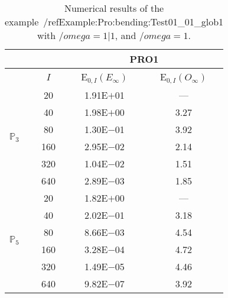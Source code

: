 \begin{table}[H]
\caption{Numerical results of the example~/ref{Example:Pro:bending:Test01_01_glob1} with $/omega=1|1$, and $/omega=1$.}
\setlength{\tabcolsep}{5pt}
\centering
\begin{tabular}{@{}l c c c@{}}
\toprule
 &  & \multicolumn{2}{c}{PRO1}\\
\midrule
 & $I$ & E$_{0,I}(E_{\infty})$ & E$_{0,I}(O_{\infty})$\\
\midrule
\multirow{6}{*}{$\mathbb{P}_{3}$}
 & 20 & 1.91E$+$01 & ---\\
 & 40 & 1.98E$+$00 & 3.27\\
 & 80 & 1.30E$-$01 & 3.92\\
 & 160 & 2.95E$-$02 & 2.14\\
 & 320 & 1.04E$-$02 & 1.51\\
 & 640 & 2.89E$-$03 & 1.85\\
\midrule
\multirow{6}{*}{$\mathbb{P}_{5}$}
 & 20 & 1.82E$+$00 & ---\\
 & 40 & 2.02E$-$01 & 3.18\\
 & 80 & 8.66E$-$03 & 4.54\\
 & 160 & 3.28E$-$04 & 4.72\\
 & 320 & 1.49E$-$05 & 4.46\\
 & 640 & 9.82E$-$07 & 3.92\\
\bottomrule
\end{tabular}
\label{Table:PRO:test_01_01_test23_pro1}
\end{table}
